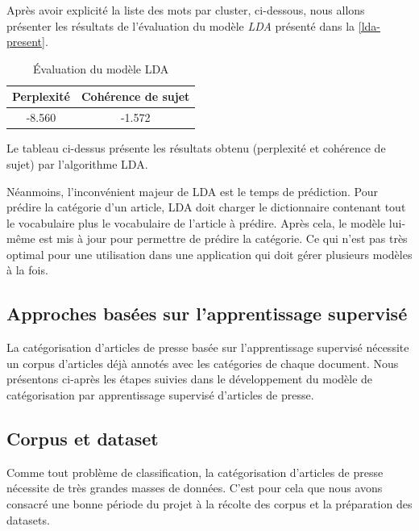     Après avoir explicité la liste des mots par cluster, ci-dessous, nous allons présenter les résultats de l'évaluation du modèle \emph{LDA} présenté dans la \autoref{lda-present}.
    \begin{table}[H]
        \begin{center}
            \begin{tabular}{|c|c|}
                \hline
                \textbf{Perplexité} & \textbf{Cohérence de sujet} \\
                \hline
                -8.560 &-1.572  \\
                \hline
            \end{tabular}
        \end{center}
        \caption{Évaluation du modèle LDA}
        \label{Eval LDA}
    \end{table}

    Le tableau ci-dessus présente les résultats obtenu (perplexité et cohérence de sujet) par l'algorithme LDA.

    Néanmoins, l'inconvénient majeur de LDA est le temps de prédiction. Pour prédire la catégorie d'un article, LDA doit charger le dictionnaire contenant tout le vocabulaire plus le vocabulaire de l'article à prédire. Après cela, le modèle lui-même est mis à jour pour permettre de prédire la catégorie. Ce qui n'est pas très optimal pour une utilisation dans une application qui doit gérer plusieurs modèles à la fois.


\subsection{Approches basées sur l'apprentissage supervisé}
La catégorisation d'articles de presse basée sur l'apprentissage supervisé nécessite un corpus d'articles déjà annotés avec les catégories de chaque document. Nous présentons ci-après les étapes suivies dans le développement du modèle de catégorisation par apprentissage supervisé d'articles de presse.

\subsection{Corpus et dataset}
Comme tout problème de classification, la catégorisation d'articles de presse nécessite de très grandes masses de données. C'est pour cela que nous avons  consacré une bonne période du projet à la récolte des corpus et la préparation des datasets.     

